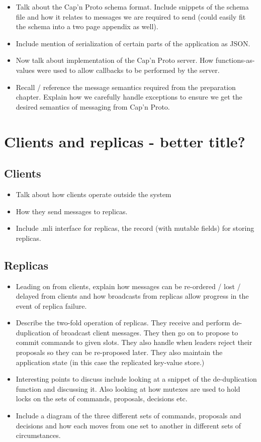 \documentclass[12pt,twoside,notitlepage]{report}
\begin{document}
\begin{itemize}
  \item Talk about the Cap'n Proto schema format. Include snippets of the schema file and how it relates to messages we are required to send (could easily fit the schema into a two page appendix as well).
  \item Include mention of serialization of certain parts of the application as JSON.
  \item Now talk about implementation of the Cap'n Proto server. How functions-as-values were used to allow callbacks to be performed by the server.
  \item Recall / reference the message semantics required from the preparation chapter. Explain how we carefully handle exceptions to ensure we get the desired semantics of messaging from Cap'n Proto.
 \end{itemize}

\section{Clients and replicas - better title?}

\subsection{Clients}
\begin{itemize}
  \item Talk about how clients operate outside the system
  \item How they send messages to replicas.
  \item Include .mli interface for replicas, the record (with mutable fields) for storing replicas.
\end{itemize}

\subsection{Replicas}
\begin{itemize}
  \item Leading on from clients, explain how messages can be re-ordered / lost / delayed from clients and how broadcasts from replicas allow progress in the event of replica failure.
  \item Describe the two-fold operation of replicas. They receive and perform de-duplication of broadcast client messages. They then go on to propose to commit commands to given slots. They also handle when leaders reject their proposals so they can be re-proposed later. They also maintain the application state (in this case the replicated key-value store.)
  \item Interesting points to discuss include looking at a snippet of the de-duplication function and discussing it. Also looking at how mutexes are used to hold locks on the sets of commands, proposals, decisions etc.
  \item Include a diagram of the three different sets of commands, proposals and decisions and how each moves from one set to another in different sets of circumstances.
\end{itemize}
\end{document}
